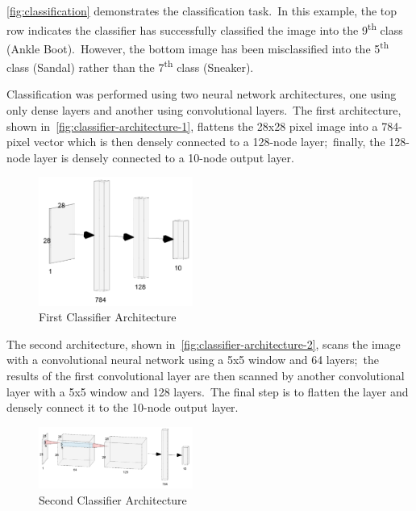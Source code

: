 \documentclass[conference]{IEEEtran}
\begin{document}
    \autoref{fig:classification} demonstrates the classification task.\ In this example, the top row indicates the classifier has successfully classified the image into the 9\textsuperscript{th} class (Ankle Boot).\ However, the bottom image has been misclassified into the 5\textsuperscript{th} class (Sandal) rather than the 7\textsuperscript{th} class (Sneaker).

    Classification was performed using two neural network architectures, one using only dense layers and another using convolutional layers.\ The first architecture, shown in~\autoref{fig:classifier-architecture-1}, flattens the 28x28 pixel image into a 784-pixel vector which is then densely connected to a 128-node layer;\ finally, the 128-node layer is densely connected to a 10-node output layer.

    \begin{figure}
        \caption{First Classifier Architecture}
        \label{fig:classifier-architecture-1}
        \begin{center}
            \includegraphics[width=0.45\textwidth]{First_Classifier_Architecture.png}
        \end{center}
    \end{figure}

    The second architecture, shown in~\autoref{fig:classifier-architecture-2}, scans the image with a convolutional neural network using a 5x5 window and 64 layers;\ the results of the first convolutional layer are then scanned by another convolutional layer with a 5x5 window and 128 layers.\ The final step is to flatten the layer and densely connect it to the 10-node output layer.

    \begin{figure}
        \caption{Second Classifier Architecture}
        \label{fig:classifier-architecture-2}
        \begin{center}
            \includegraphics[width=0.45\textwidth]{Second_Classifier_Architecture.png}
        \end{center}
    \end{figure}
\end{document}
